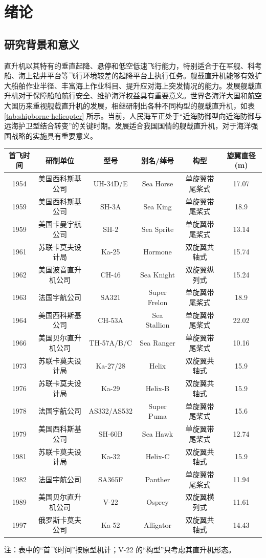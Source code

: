 
\chapter{绪论\label{chap:=007EEA=008BBA}}

\section{研究背景和意义}

直升机以其特有的垂直起降、悬停和低空低速飞行能力，特别适合于在军舰、科考船、海上钻井平台等飞行环境较差的起降平台上执行任务。舰载直升机能够有效扩大船舶作业半径、丰富海上作业科目、提升应对海上突发情况的能力。发展舰载直升机对于保障船舶航行安全、维护海洋权益具有重要意义。世界各海洋大国和航空大国历来重视舰载直升机的发展，相继研制出各种不同构型的舰载直升机，如表
\ref{tab:shipborne-helicopter} 所示。当前，人民海军正处于“近海防御型向近海防御与远海护卫型结合转变”的关键时期。发展适合我国国情的舰载直升机，对于海洋强国战略的实施具有重要意义。
\begin{table}
\caption{\label{tab:shipborne-helicopter}国外主要舰载直升机}

\begin{longtable}[c]{cccccc}
\toprule 
首飞时间 & 研制单位 & 型号 & 别名/绰号 & 构型 & 旋翼直径 (m)\tabularnewline
\midrule
1954 & 美国西科斯基公司 & UH-34D/E & Sea Horse & 单旋翼带尾桨式 & 17.07\tabularnewline
1959 & 美国西科斯基公司 & SH-3A & Sea King & 单旋翼带尾桨式 & 18.9\tabularnewline
1959 & 美国卡曼宇航公司 & SH-2 & Sea Sprite & 单旋翼带尾桨式 & 13.14\tabularnewline
1961 & 苏联卡莫夫设计局 & Ka-25 & Hormone & 双旋翼共轴式 & 15.74\tabularnewline
1962 & 美国波音直升机公司 & CH-46 & Sea Knight & 双旋翼纵列式 & 15.24\tabularnewline
1963 & 法国宇航公司 & SA321 & Super Frelon & 单旋翼带尾桨式 & 18.9\tabularnewline
1964 & 美国西科斯基公司 & CH-53A & Sea Stallion & 单旋翼带尾桨式 & 22.02\tabularnewline
1966 & 美国贝尔直升机公司 & TH-57A/B/C & Sea Ranger & 单旋翼带尾桨式 & 10.16\tabularnewline
1973 & 苏联卡莫夫设计局 & Ka-27/28 & Helix & 双旋翼共轴式 & 15.9\tabularnewline
1976 & 苏联卡莫夫设计局 & Ka-29 & Helix-B & 双旋翼共轴式 & 15.9\tabularnewline
1978 & 法国宇航公司 & AS332/AS532 & Super Puma & 单旋翼带尾桨式 & 15.6\tabularnewline
1979 & 美国西科斯基公司 & SH-60B & Sea Hawk & 单旋翼带尾桨式 & 12.74\tabularnewline
1981 & 苏联卡莫夫设计局 & Ka-32 & Helix-C & 双旋翼共轴式 & 15.9\tabularnewline
1982 & 法国宇航公司 & SA365F & Panther & 单旋翼带尾桨式 & 11.94\tabularnewline
1989 & 美国贝尔直升机公司 & V-22 & Osprey & 双旋翼横列式 & 11.61\tabularnewline
1997 & 俄罗斯卡莫夫公司 & Ka-52 & Alligator & 双旋翼共轴式 & 14.43\tabularnewline
\bottomrule
\end{longtable}
\centering{}注：表中的“首飞时间”按原型机计；V-22 的“构型”只考虑其直升机形态。
\end{table}

